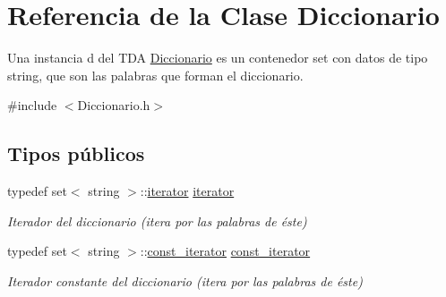 \hypertarget{classDiccionario}{}\section{Referencia de la Clase Diccionario}
\label{classDiccionario}


Una instancia d del T\+DA \hyperlink{classDiccionario}{Diccionario} es un contenedor set con datos de tipo string, que son las palabras que forman el diccionario.  




{\ttfamily \#include $<$Diccionario.\+h$>$}

\subsection*{Tipos públicos}
\begin{DoxyCompactItemize}
\item 
\mbox{\label{classDiccionario_a51a063699a325e85d6c2640e9c4b42cf}} 
typedef set$<$ string $>$\+::\hyperlink{classDiccionario_a51a063699a325e85d6c2640e9c4b42cf}{iterator} \hyperlink{classDiccionario_a51a063699a325e85d6c2640e9c4b42cf}{iterator}
\begin{DoxyCompactList}\small\item\em Iterador del diccionario (itera por las palabras de éste) \end{DoxyCompactList}\item 
\mbox{\label{classDiccionario_acc32ba2eaee59fdd4836d9a28f04afd0}} 
typedef set$<$ string $>$\+::\hyperlink{classDiccionario_acc32ba2eaee59fdd4836d9a28f04afd0}{const\+\_\+iterator} \hyperlink{classDiccionario_acc32ba2eaee59fdd4836d9a28f04afd0}{const\+\_\+iterator}
\begin{DoxyCompactList}\small\item\em Iterador constante del diccionario (itera por las palabras de éste) \end{DoxyCompactList}\end{DoxyCompactItemize}
